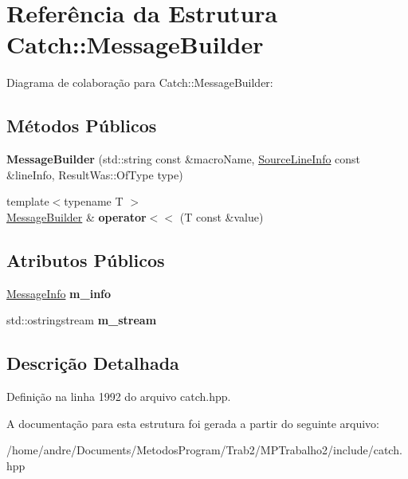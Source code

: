 \hypertarget{structCatch_1_1MessageBuilder}{}\section{Referência da Estrutura Catch\+:\+:Message\+Builder}
\label{structCatch_1_1MessageBuilder}


Diagrama de colaboração para Catch\+:\+:Message\+Builder\+:
\subsection*{Métodos Públicos}
\begin{DoxyCompactItemize}
\item 
{\bfseries Message\+Builder} (std\+::string const \&macro\+Name, \hyperlink{structCatch_1_1SourceLineInfo}{Source\+Line\+Info} const \&line\+Info, Result\+Was\+::\+Of\+Type type)\hypertarget{structCatch_1_1MessageBuilder_ab0c6378e722680bf58852c6ee2b6e724}{}\label{structCatch_1_1MessageBuilder_ab0c6378e722680bf58852c6ee2b6e724}

\item 
{\footnotesize template$<$typename T $>$ }\\\hyperlink{structCatch_1_1MessageBuilder}{Message\+Builder} \& {\bfseries operator$<$$<$} (T const \&value)\hypertarget{structCatch_1_1MessageBuilder_a20fa48d069b20dddcc2d3df8abb123c1}{}\label{structCatch_1_1MessageBuilder_a20fa48d069b20dddcc2d3df8abb123c1}

\end{DoxyCompactItemize}
\subsection*{Atributos Públicos}
\begin{DoxyCompactItemize}
\item 
\hyperlink{structCatch_1_1MessageInfo}{Message\+Info} {\bfseries m\+\_\+info}\hypertarget{structCatch_1_1MessageBuilder_a979f1c2b36d78f80ee275bfa5ba0209f}{}\label{structCatch_1_1MessageBuilder_a979f1c2b36d78f80ee275bfa5ba0209f}

\item 
std\+::ostringstream {\bfseries m\+\_\+stream}\hypertarget{structCatch_1_1MessageBuilder_a6488ab0cc4ea52affc9c0612c7c5df6b}{}\label{structCatch_1_1MessageBuilder_a6488ab0cc4ea52affc9c0612c7c5df6b}

\end{DoxyCompactItemize}


\subsection{Descrição Detalhada}


Definição na linha 1992 do arquivo catch.\+hpp.



A documentação para esta estrutura foi gerada a partir do seguinte arquivo\+:\begin{DoxyCompactItemize}
\item 
/home/andre/\+Documents/\+Metodos\+Program/\+Trab2/\+M\+P\+Trabalho2/include/catch.\+hpp\end{DoxyCompactItemize}
